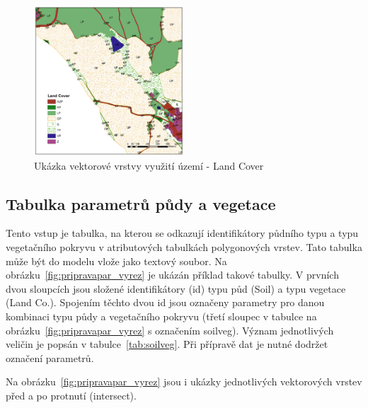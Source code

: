 \begin{figure}
  \centering
  \includegraphics[width=0.5\textwidth]{./img/LandCover.png}
  \caption{Ukázka vektorové vrstvy využití území -  Land Cover}
  \label{fig:bykovicevegetace}
\end{figure}



\subsection{Tabulka parametrů půdy a vegetace}  \label{sec:upravatabulkyparametru}

Tento vstup je tabulka, na kterou se odkazují identifikátory půdního typu a typu vegetačního pokryvu v atributových tabulkách polygonových vrstev. Tato tabulka může být do modelu vlože jako textový soubor. Na obrázku~\ref{fig:pripravapar_vyrez} je ukázán příklad takové tabulky. V prvních dvou sloupcích jsou složené identifikátory (id) typu půd (Soil) a typu vegetace (Land Co.). Spojením těchto dvou id jsou označeny parametry pro danou kombinaci typu půdy a vegetačního pokryvu (třetí sloupec v tabulce na obrázku~\ref{fig:pripravapar_vyrez} s označením soilveg). Význam jednotlivých veličin je popsán v tabulce~\ref{tab:soilveg}. Při přípravě dat je nutné dodržet označení parametrů. 

Na obrázku~\ref{fig:pripravapar_vyrez} jsou i ukázky jednotlivých vektorových vrstev před a po protnutí (intersect). 


